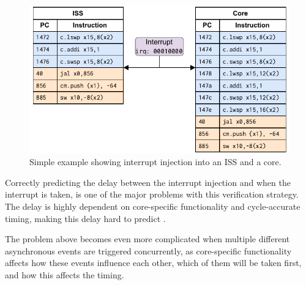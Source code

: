 \begin{figure}
    \centering
    \includegraphics[width=0.75\linewidth]{figures/lw_add_sw_example.pdf}
    \caption{Simple example showing interrupt injection into an ISS and a core.}
    \label{fig:lw_example}
\end{figure}

Correctly predicting the delay between the interrupt injection and when the interrupt is taken, is one of the major problems with this verification strategy. The delay is highly dependent on core-specific functionality and cycle-accurate timing, making this delay hard to predict \cite{taylorAdvancedRISCVVerification2023}. 

The problem above becomes even more complicated when multiple different asynchronous events are triggered concurrently, as core-specific functionality affects how these events influence each other, which of them will be taken first, and how this affects the timing. 






%



%
%


%    

